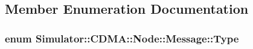 \subsection{Member Enumeration Documentation}
\hypertarget{union_simulator_1_1_c_d_m_a_1_1_node_1_1_message_ac3095cafaabbfe8a9bff7d8600899119}{
\subsubsection[{Type}]{\setlength{\rightskip}{0pt plus 5cm}enum {\bf Simulator\+::\+C\+D\+M\+A\+::\+Node\+::\+Message\+::\+Type}}}\label{union_simulator_1_1_c_d_m_a_1_1_node_1_1_message_ac3095cafaabbfe8a9bff7d8600899119}
